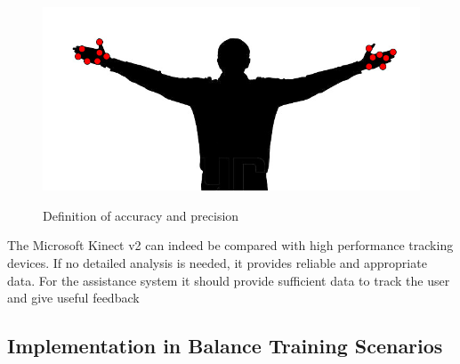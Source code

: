 \begin{figure}[htb]
\begin{minipage}[t]{0.49\linewidth}
		\label{fig:systemAccuratePrecise}
	\end{minipage}
	\hfill
	\begin{minipage}[t]{0.49\linewidth}
		\centering
		\includegraphics[width=1\linewidth]{Pictures/systemAccurateImprecise}
		\label{fig:systemAccurateImprecise}
	\end{minipage}
	\caption{Definition of accuracy and precision~\cite{Woolford2015-ub}}
	\label{fig:systemAccuracyAndPrecisiong}
\end{figure}

The Microsoft Kinect v2 can indeed be compared with high performance tracking devices. If no detailed analysis is needed, it provides reliable and appropriate data. For the assistance system it should provide sufficient data to track the user and give useful feedback

\subsection{Implementation in Balance Training Scenarios}

